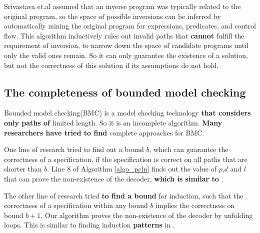 \documentclass[journal]{IEEEtran}
\begin{document}
{Srivastava et.al \cite{prog_inv_rev} assumed that an inverse program was typically related to the original program,
so the space of possible inversions can be inferred by automatically
mining the original program for expressions, predicates, and control flow.
This algorithm inductively rules out invalid paths that \textbf{cannot} fulfill the requirement of inversion,
to narrow down the space of candidate programs until only the valid ones remain.
So it can only guarantee the existence of a solution,
but not the correctness of this solution if its assumptions do not hold.

\subsection{The completeness of bounded model checking}\label{subsec_bmc_relate}
Bounded model checking(BMC) \cite{bmc_tacas99} is a model checking technology \textbf{that considers only paths of} limited length.
So it is an incomplete algorithm.
\textbf{Many researchers have tried to find} complete approaches for BMC.

One line of research\cite{bmc_tacas99,RecDiam} tried to find out a bound $b$,
which can guarantee the correctness of a specification,
if the specification is correct on all paths that are shorter than $b$.
Line 8 of Algorithm \ref{algo_pcln} finds out the value of $p$,$d$ and $l$ that can prove the non-existence of the decoder,
\textbf{which is similar to \cite{bmc_tacas99,RecDiam}}.

The other line of research\cite{kind_tacas99} tried \textbf{to find a bound} for induction,
such that the correctness of a specification within any bound $b$ implies the correctness on bound $b+1$.
Our algorithm proves the non-existence of the decoder by unfolding loops.
This is similar to finding induction \textbf{patterns} in \textbf{\cite{kind_tacas99}}.


}
\end{document}

